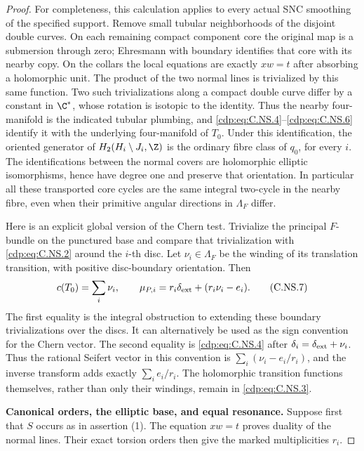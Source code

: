 \begin{proof}
For completeness, this calculation applies to every
actual SNC smoothing of the specified support.
Remove small tubular neighborhoods of the disjoint
double curves. On each remaining compact component
core the original map is a submersion through zero;
Ehresmann with boundary identifies that core with
its nearby copy. On the collars the local equations
are exactly $xw=t$ after absorbing a holomorphic
unit. The product of the two normal lines is
trivialized by this same function. Two such
trivializations along a compact double curve differ
by a constant in $\C^*$, whose rotation is isotopic
to the identity. Thus the nearby four-manifold is
the indicated tubular plumbing, and \eqref{cdp:eq:C.NS.4}--\eqref{cdp:eq:C.NS.6}
identify it with the underlying four-manifold of
$T_0$. Under this identification, the oriented
generator of $H_2(H_i\setminus J_i,\Z)$ is the
ordinary fibre class of $q_0$, for every $i$.
The identifications between the normal covers are
holomorphic elliptic isomorphisms, hence have degree
one and preserve that orientation. In particular all
these transported core cycles are the same integral
two-cycle in the nearby fibre, even when their
primitive angular directions in $\Lambda_F$ differ.

Here is an explicit global version of the Chern test.
Trivialize the principal $F$-bundle on the punctured
base and compare that trivialization with \eqref{cdp:eq:C.NS.2}
around the $i$-th disc. Let $\nu_i\in\Lambda_F$ be
the winding of its translation transition, with
positive disc-boundary orientation. Then
\[
 c(T_0)=\sum_i\nu_i,\qquad
 \mu_{P,i}=r_i\delta_{\rm ext}
                    +(r_i\nu_i-e_i).
                                                        \tag{C.NS.7}\label{cdp:eq:C.NS.7}
\]
The first equality is the integral obstruction to
extending these boundary trivializations over the
discs. It can alternatively be used as the sign
convention for the Chern vector. The second equality
is \eqref{cdp:eq:C.NS.4} after $\delta_i=\delta_{\rm ext}+\nu_i$.
Thus the rational Seifert vector in this convention
is $\sum_i(\nu_i-e_i/r_i)$, and the inverse transform
adds exactly $\sum_i e_i/r_i$. The holomorphic
transition functions themselves, rather than only
their windings, remain in \eqref{cdp:eq:C.NS.3}.

\par\medskip\noindent\textbf{Canonical orders, the elliptic base, and equal resonance.}
Suppose first that $S$ occurs as in assertion (1).
The equation $xw=t$ proves duality of the normal
lines. Their exact torsion orders then give the
marked multiplicities $r_i$.


\end{proof}
